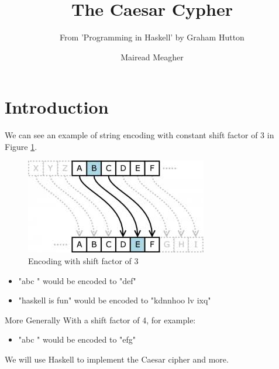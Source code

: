 \documentclass{beamer}
\title{The Caesar Cypher}
\subtitle{From 'Programming in Haskell' by Graham Hutton}
\author[MM]{Mairead Meagher}
\institute[Waterford Institute of Technology]{
  Waterford Institute of Technology 
}
\def\frametitle#1{}
\begin{document}
  

\begin{frame}
    \titlepage
\end{frame}


\section{Introduction}
\begin{frame} [fragile, label = test]

  \frametitle{Caesar Cipher}

We can see an example of string encoding with constant shift factor of 3 in Figure \ref{fig:cipher}.
    \pause

 \begin{figure}[H]
			\centering
			\includegraphics[page=1,width=.5\textwidth]{img/cipher.jpg}
				   \caption{Encoding with shift factor of 3}
		   \label{fig:cipher}
		   \end{figure}
 
 \begin{itemize}
 \item
 "abc " would be encoded to "def"  
 \item
 "haskell is fun" would be encoded to "kdnnhoo lv ixq"

 \end{itemize}
\end{frame}
\begin{frame} [fragile, label = test]

    \frametitle{Caesar Cipher contd..}
More Generally 
With a shift factor of 4, for example:

 \begin{itemize}
 \item
 "abc " would be encoded to "efg"  
  \end{itemize}

We will  use Haskell to implement the Caesar cipher and more.
\end{frame}
 
\end{document}

